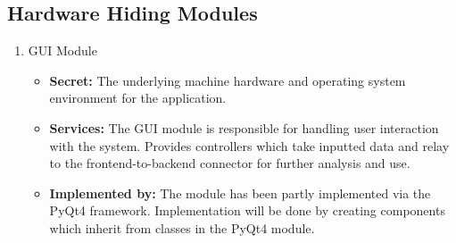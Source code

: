 \documentclass{article}
\begin{document}
\subsection{Hardware Hiding Modules}
\begin{enumerate}
\item
GUI Module

\begin{itemize}
\item
\textbf{Secret:} The underlying machine hardware and operating system environment for the application.

\item
\textbf{Services:} The GUI module is responsible for handling user interaction with the system. Provides controllers which take inputted data and relay to the frontend-to-backend connector for further analysis and use.

\item
\textbf{Implemented by:} The module has been partly implemented via the PyQt4 framework. Implementation will be done by creating components which inherit from classes in the PyQt4 module.
\end{itemize}
\end{enumerate}
\end{document}
